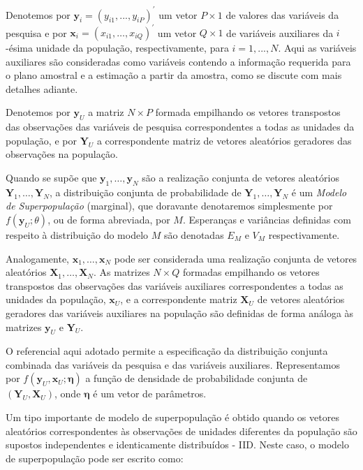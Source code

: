 \documentclass[
  12pt,
  brazilian,
]{book}
\theoremstyle{definition}
\theoremstyle{definition}
\theoremstyle{definition}
\theoremstyle{definition}
\theoremstyle{remark}
\begin{document}
Denotemos por \(\mathbf{y}_i=(y_{i1},...,y_{iP})^{\prime }\) um vetor \(P \times 1\)
de valores das variáveis da pesquisa e por \(\mathbf{x}_{i} = (x_{i1}, \ldots, x_{iQ})^{\prime }\) um vetor \(Q\times 1\) de variáveis auxiliares da \(i\)-ésima unidade da população, respectivamente, para \(i=1,...,N\). Aqui as variáveis auxiliares são consideradas como variáveis contendo a informação requerida para o plano amostral e a estimação a partir da amostra, como se discute com mais detalhes adiante.

Denotemos por \(\mathbf{y}_{U}\) a matriz \(N \times P\) formada empilhando os vetores transpostos das observações das variáveis de pesquisa correspondentes a todas as unidades da população, e por \(\mathbf{Y}_{U}\) a correspondente matriz de vetores aleatórios geradores das observações na população.

Quando se supõe que \(\mathbf{y}_1 , \ldots, \mathbf{y}_N\) são a realização
conjunta de vetores aleatórios \(\mathbf{Y}_1, \ldots, \mathbf{Y}_N\), a
distribuição conjunta de probabilidade de \(\mathbf{Y}_1, \ldots, \mathbf{Y}_N\) é
um \emph{Modelo de Superpopulação} (marginal), que doravante denotaremos simplesmente
por \(f(\mathbf{y}_U;\theta)\), ou de forma abreviada, por \(M\). Esperanças e
variâncias definidas com respeito à distribuição do modelo \(M\) são denotadas
\(E_M\) e \(V_M\) respectivamente.

Analogamente, \(\mathbf{x}_1, \ldots, \mathbf{x}_N\) pode ser considerada uma
realização conjunta de vetores aleatórios \(\mathbf{X}_1, \ldots, \mathbf{X}_N\).
As matrizes \(N \times Q\) formadas empilhando os vetores transpostos das
observações das variáveis auxiliares correspondentes a todas as unidades da
população, \(\mathbf{x}_{U}\), e a correspondente matriz \(\mathbf{X}_{U}\) de
vetores aleatórios geradores das variáveis auxiliares na população são definidas
de forma análoga às matrizes \(\mathbf{y}_{U}\) e \(\mathbf{Y}_{U}\).

O referencial aqui adotado permite a especificação da distribuição conjunta
combinada das variáveis da pesquisa e das variáveis auxiliares. Representamos
por \(f( \mathbf{y}_U , \mathbf{x}_U ; \mathbf{\eta} )\) a função de densidade de
probabilidade conjunta de \(( \mathbf{Y}_U , \mathbf{X}_U )\), onde \(\mathbf{\eta}\) é um vetor de parâmetros.

Um tipo importante de modelo de superpopulação é obtido quando os vetores
aleatórios correspondentes às observações de unidades diferentes da população
são supostos independentes e identicamente distribuídos - IID. Neste caso, o
modelo de superpopulação pode ser escrito como:
\end{document}
